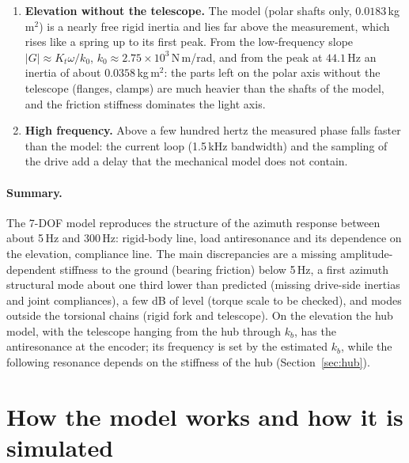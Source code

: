 \documentclass[10pt,a4paper]{article}
\numberwithin{equation}{section}
\begin{document}
\begin{enumerate}
\item \textbf{Elevation without the telescope.} The model (polar shafts only, $0.0183$\,kg\,m$^2$) is a nearly free rigid inertia and lies far above the measurement, which rises like a spring up to its first peak. From the low-frequency slope $|G| \approx K_t\omega/k_0$, $k_0 \approx 2.75\times10^{3}$\,N\,m/rad, and from the peak at $44.1$\,Hz an inertia of about $0.0358$\,kg\,m$^2$: the parts left on the polar axis without the telescope (flanges, clamps) are much heavier than the shafts of the model, and the friction stiffness dominates the light axis.
\item \textbf{High frequency.} Above a few hundred hertz the measured phase falls faster than the model: the current loop (1.5\,kHz bandwidth) and the sampling of the drive add a delay that the mechanical model does not contain.
\end{enumerate}

\paragraph{Summary.} The 7-DOF model reproduces the structure of the azimuth response between about 5\,Hz and 300\,Hz: rigid-body line, load antiresonance and its dependence on the elevation, compliance line. The main discrepancies are a missing amplitude-dependent stiffness to the ground (bearing friction) below 5\,Hz, a first azimuth structural mode about one third lower than predicted (missing drive-side inertias and joint compliances), a few dB of level (torque scale to be checked), and modes outside the torsional chains (rigid fork and telescope). On the elevation the hub model, with the telescope hanging from the hub through $k_b$, has the antiresonance at the encoder; its frequency is set by the estimated $k_b$, while the following resonance depends on the stiffness of the hub (Section~\ref{sec:hub}).
\section{How the model works and how it is simulated}\label{sec:workflow}
\end{document}
